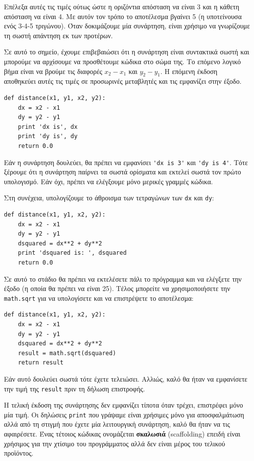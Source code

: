 \documentclass[10pt]{book}
\begin{document}
Επέλεξα αυτές τις τιμές ούτως ώστε η οριζόντια απόσταση να είναι 3 και η
κάθετη απόσταση να είναι 4. Με αυτόν τον τρόπο το αποτέλεσμα βγαίνει 5
(η υποτείνουσα ενός 3-4-5 τριγώνου). Όταν δοκιμάζουμε μία συνάρτηση, είναι
χρήσιμο να γνωρίζουμε τη σωστή απάντηση εκ των προτέρων.

Σε αυτό το σημείο, έχουμε επιβεβαιώσει ότι η συνάρτηση είναι συντακτικά σωστή
και μπορούμε να αρχίσουμε να προσθέτουμε κώδικα στο σώμα της.
Το επόμενο λογικό βήμα είναι να βρούμε τις διαφορές $x_2 - x_1$ και $y_2 - y_1$. Η επόμενη έκδοση αποθηκεύει αυτές τις τιμές σε προσωρινές μεταβλητές και τις εμφανίζει στην έξοδο.


\begin{verbatim}
def distance(x1, y1, x2, y2):
    dx = x2 - x1
    dy = y2 - y1
    print 'dx is', dx
    print 'dy is', dy
    return 0.0
\end{verbatim}
%

Εάν η συνάρτηση δουλεύει, θα πρέπει να εμφανίσει \verb"'dx is 3'" και 
\verb"'dy is 4'". Τότε ξέρουμε ότι η συνάρτηση παίρνει τα σωστά ορίσματα και εκτελεί σωστά τον πρώτο υπολογισμό. Εάν όχι, πρέπει να ελέγξουμε μόνο μερικές γραμμές κώδικα.

Στη συνέχεια, υπολογίζουμε το άθροισμα των τετραγώνων των {\tt dx} και {\tt dy}:

\begin{verbatim}
def distance(x1, y1, x2, y2):
    dx = x2 - x1
    dy = y2 - y1
    dsquared = dx**2 + dy**2
    print 'dsquared is: ', dsquared
    return 0.0
\end{verbatim}
%

Σε αυτό το στάδιο θα πρέπει να εκτελέσετε πάλι το πρόγραμμα και να ελέγξετε την
έξοδο (η οποία θα πρέπει να είναι 25). Τέλος μπορείτε να χρησιμοποιήσετε την {\tt math.sqrt} για να υπολογίσετε και να επιστρέψετε το αποτέλεσμα:

\begin{verbatim}
def distance(x1, y1, x2, y2):
    dx = x2 - x1
    dy = y2 - y1
    dsquared = dx**2 + dy**2
    result = math.sqrt(dsquared)
    return result
\end{verbatim}
%

Εάν αυτό δουλεύει σωστά τότε έχετε τελειώσει. Αλλιώς, καλό θα ήταν
να εμφανίσετε την τιμή της {\tt result} πριν τη δήλωση επιστροφής.

Η τελική έκδοση της συνάρτησης δεν εμφανίζει τίποτα όταν τρέχει, επιστρέφει
μόνο μία τιμή. Οι δηλώσεις {\tt print} που γράψαμε είναι χρήσιμες μόνο για
αποσφαλμάτωση αλλά από τη στιγμή που έχετε μία λειτουργική συνάρτηση, καλό θα ήταν να τις αφαιρέσετε. Ένας τέτοιος κώδικας ονομάζεται {\bf σκαλωσιά} (scaffolding) επειδή είναι χρήσιμος για την χτίσιμο του προγράμματος αλλά δεν είναι μέρος του τελικού προϊόντος.
\end{document}
